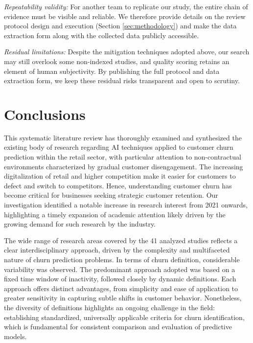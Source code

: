 \documentclass[preprint,12pt]{elsarticle}
\begin{document}
\textit{Repeatability validity: } For another team to replicate our study, the entire chain of evidence must be visible and reliable. We therefore provide details on the review protocol design and execution (Section \ref{sec:methodology}) and make the data extraction form along with the collected data publicly accessible. 

\textit{Residual limitations: } Despite the mitigation techniques adopted above, our search may still overlook some non-indexed studies, and quality scoring retains an element of human subjectivity. By publishing the full protocol and data extraction form, we keep these residual risks transparent and open to scrutiny.

\section{Conclusions}
\label{sec:conclusions}

This systematic literature review has thoroughly examined and synthesized the existing body of research regarding AI techniques applied to customer churn prediction within the retail sector, with particular attention to non-contractual environments characterized by gradual customer disengagement. The increasing digitalization of retail and higher competition make it easier for customers to defect and switch to competitors. Hence, understanding customer churn has become critical for businesses seeking strategic customer retention.
Our investigation identified a notable increase in research interest from 2021 onwards, highlighting a timely expansion of academic attention likely driven by the growing demand for such research by the industry.

The wide range of research areas covered by the 41 analyzed studies reflects a clear interdisciplinary approach, driven by the complexity and multifaceted nature of churn prediction problems.
In terms of churn definition, considerable variability was observed. The predominant approach adopted was based on a fixed time window of inactivity, followed closely by dynamic definitions. Each approach offers distinct advantages, from simplicity and ease of application to greater sensitivity in capturing subtle shifts in customer behavior. Nonetheless, the diversity of definitions highlights an ongoing challenge in the field: establishing standardized, universally applicable criteria for churn identification, which is fundamental for consistent comparison and evaluation of predictive models.
\end{document}
